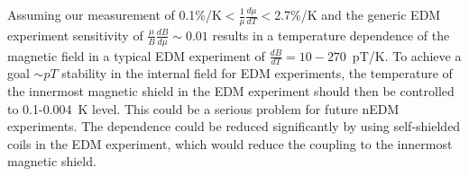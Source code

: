 \documentclass[review]{elsarticle}
\begin{document}
Assuming our measurement of
0.1\%/K$<\frac{1}{\mu}\frac{d\mu}{dT}<$2.7\%/K and the generic EDM
experiment sensitivity of $\frac{\mu}{B}\frac{dB}{d\mu}\sim 0.01$
results in a temperature dependence of the magnetic field in a typical
EDM experiment of $\frac{dB}{dT}=10-270$~pT/K.  To achieve a goal
$\sim pT$ stability in the internal field for EDM experiments, the
temperature of the innermost magnetic shield in the EDM experiment
should then be controlled to 0.1-0.004~K level.  This could be a
serious problem for future nEDM experiments.  The dependence could be
reduced significantly by using self-shielded coils in the EDM
experiment, which would reduce the coupling to the innermost magnetic
shield.









\end{document}
